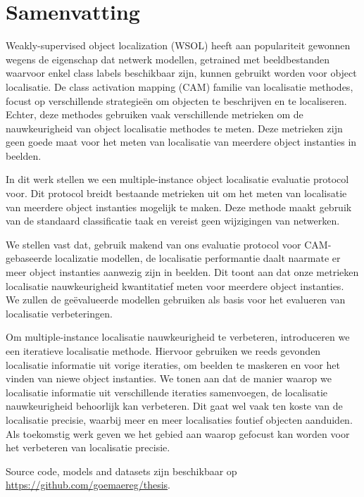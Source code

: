 \chapter*{Samenvatting}

Weakly-supervised object localization (WSOL) heeft aan populariteit gewonnen wegens de eigenschap dat netwerk modellen, getrained met beeldbestanden waarvoor enkel class labels beschikbaar zijn, kunnen gebruikt worden voor object localisatie. De class activation mapping (CAM) familie van localisatie methodes, focust op verschillende strategieën om objecten te beschrijven en te localiseren. Echter, deze methodes gebruiken vaak verschillende metrieken om de nauwkeurigheid van object localisatie methodes te meten. Deze metrieken zijn geen goede maat voor het meten van localisatie van meerdere object instanties in beelden.

In dit werk stellen we een multiple-instance object localisatie evaluatie protocol voor. Dit protocol breidt bestaande metrieken uit om het meten van localisatie van meerdere object instanties mogelijk te maken. Deze methode maakt gebruik van de standaard classificatie taak en vereist geen wijzigingen van netwerken.

We stellen vast dat, gebruik makend van ons evaluatie protocol voor CAM-gebaseerde localizatie modellen, de localisatie performantie daalt naarmate er meer object instanties aanwezig zijn in beelden. Dit toont aan dat onze metrieken localisatie nauwkeurigheid kwantitatief meten voor meerdere object instanties. We zullen de geëvalueerde modellen gebruiken als basis voor het evalueren van localisatie verbeteringen.

Om multiple-instance localisatie nauwkeurigheid te verbeteren, introduceren we een iteratieve localisatie methode. Hiervoor gebruiken we reeds gevonden localisatie informatie uit vorige iteraties, om beelden te maskeren en voor het vinden van niewe object instanties. We tonen aan dat de manier waarop we localisatie informatie uit verschillende iteraties samenvoegen, de localisatie nauwkeurigheid behoorlijk kan verbeteren. Dit gaat wel vaak ten koste van de localisatie precisie, waarbij meer en meer localisaties foutief objecten aanduiden. Als toekomstig werk geven we het gebied aan waarop gefocust kan worden voor het verbeteren van localisatie precisie.

Source code, models and datasets zijn beschikbaar op \url{https://github.com/goemaereg/thesis}.